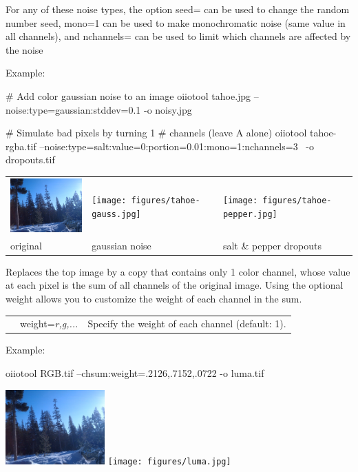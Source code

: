 For any of these noise types, the option {\cf seed=} can be used to change
the random number seed, {\cf mono=1} can be used to make monochromatic noise
(same value in all channels), and {\cf nchannels=} can be used to limit
which channels are affected by the noise

\noindent Example:
\begin{code}
    # Add color gaussian noise to an image
    oiiotool tahoe.jpg --noise:type=gaussian:stddev=0.1 -o noisy.jpg

    # Simulate bad pixels by turning 1%
    # channels (leave A alone)
    oiiotool tahoe-rgba.tif --noise:type=salt:value=0:portion=0.01:mono=1:nchannels=3 \
        -o dropouts.tif
\end{code}

\spc \begin{tabular}{lll}
\includegraphics[width=1.5in]{figures/tahoe-small.jpg} &
\texttt{[image: figures/tahoe-gauss.jpg]} &
\texttt{[image: figures/tahoe-pepper.jpg]} \\
original & gaussian noise & salt \& pepper dropouts \\
\end{tabular}
\apiend

Replaces the top image by a copy that contains only 1 color channel,
whose value at each pixel is the sum of all channels of the original
image.  Using the optional {\cf weight} allows you to customize the
weight of each channel in the sum.

\begin{tabular}{p{10pt} p{1in} p{3.5in}}
  & {\cf weight=}\emph{r,g,...} & Specify the weight of each channel
  (default: 1).
\end{tabular}

\noindent Example:
\begin{code}
    oiiotool RGB.tif --chsum:weight=.2126,.7152,.0722 -o luma.tif
\end{code}
\spc \includegraphics[width=1.5in]{figures/tahoe-small.jpg}
\raisebox{40pt}{\large $\rightarrow$}
\texttt{[image: figures/luma.jpg]} \\
\apiend

